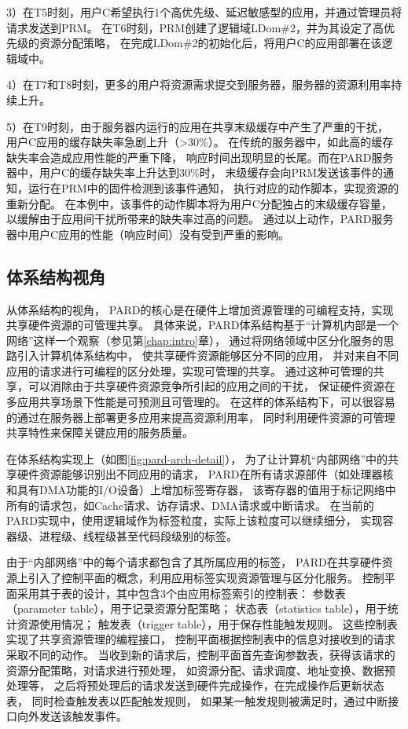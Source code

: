 3）在T5时刻，用户C希望执行1个高优先级、延迟敏感型的应用，并通过管理员将请求发送到PRM。
在T6时刻，PRM创建了逻辑域LDom\#2，并为其设定了高优先级的资源分配策略，
在完成LDom\#2的初始化后，将用户C的应用部署在该逻辑域中。

4）在T7和T8时刻，更多的用户将资源需求提交到服务器，服务器的资源利用率持续上升。

5）在T9时刻，由于服务器内运行的应用在共享末级缓存中产生了严重的干扰，
用户C应用的缓存缺失率急剧上升（>30\%）。
在传统的服务器中，如此高的缓存缺失率会造成应用性能的严重下降，
响应时间出现明显的长尾。而在PARD服务器中，用户C的缓存缺失率上升达到30\%时，
末级缓存会向PRM发送该事件的通知，运行在PRM中的固件检测到该事件通知，
执行对应的动作脚本，实现资源的重新分配。
在本例中，该事件的动作脚本将为用户C分配独占的末级缓存容量，
以缓解由于应用间干扰所带来的缺失率过高的问题。
通过以上动作，PARD服务器中用户C应用的性能（响应时间）没有受到严重的影响。


\subsection{体系结构视角}

从体系结构的视角，
PARD的核心是在硬件上增加资源管理的可编程支持，实现共享硬件资源的可管理共享。
具体来说，PARD体系结构基于``计算机内部是一个网络''这样一个观察（参见第\ref{chap:intro}章），
通过将网络领域中区分化服务的思路引入计算机体系结构中，
使共享硬件资源能够区分不同的应用，
并对来自不同应用的请求进行可编程的区分处理，实现可管理的共享。
通过这种可管理的共享，可以消除由于共享硬件资源竞争所引起的应用之间的干扰，
保证硬件资源在多应用共享场景下性能是可预测且可管理的。
在这样的体系结构下，可以很容易的通过在服务器上部署更多应用来提高资源利用率，
同时利用硬件资源的可管理共享特性来保障关键应用的服务质量。

在体系结构实现上（如图\ref{fig:pard-arch-detail}），
为了让计算机``内部网络''中的共享硬件资源能够识别出不同应用的请求，
PARD在所有请求源部件（如处理器核和具有DMA功能的I/O设备）上增加标签寄存器，
该寄存器的值用于标记网络中所有的请求包，如Cache请求、访存请求、DMA请求或中断请求。
在当前的PARD实现中，使用逻辑域作为标签粒度，实际上该粒度可以继续细分，
实现容器级、进程级、线程级甚至代码段级别的标签。

由于``内部网络''中的每个请求都包含了其所属应用的标签，
PARD在共享硬件资源上引入了控制平面的概念，利用应用标签实现资源管理与区分化服务。
控制平面采用其于表的设计，其中包含3个由应用标签索引的控制表：
参数表（parameter table），用于记录资源分配策略；
状态表（statistics table），用于统计资源使用情况；
触发表（trigger table），用于保存性能触发规则。
这些控制表实现了共享资源管理的编程接口，
控制平面根据控制表中的信息对接收到的请求采取不同的动作。
当收到新的请求后，控制平面首先查询参数表，获得该请求的资源分配策略，对请求进行预处理，
如资源分配、请求调度、地址变换、数据预处理等，
之后将预处理后的请求发送到硬件完成操作，在完成操作后更新状态表，
同时检查触发表以匹配触发规则，
如果某一触发规则被满足时，通过中断接口向外发送该触发事件。

